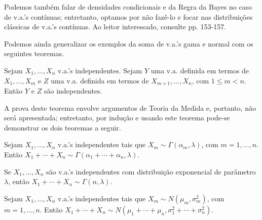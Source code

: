 \documentclass[../Notas.tex]{subfiles}
\begin{document}
\begin{remark}
Podemos também falar de densidades condicionais e da Regra da Bayes no caso de v.a.'s contínuas; entretanto, optamos por não fazê-lo e focar nas distribuições clássicas de v.a.'s contínuas. Ao leitor interessado, consulte \cite{Hoel} pp. 153-157.
\end{remark}

Podemos ainda generalizar os exemplos da soma de v.a.'s gama e normal com os seguintes teoremas.

\begin{theorem}
Sejam $X_1, \dots, X_n$ v.a.'s independentes. Sejam $Y$ uma v.a. definida em termos de $X_1, \dots, X_m$ e $Z$ uma v.a. definida em termos de $X_{m+1}, \dots, X_n$, com $1\leq m < n$. Então $Y$ e $Z$ são independentes.
\end{theorem}

A prova deste teorema envolve argumentos de Teoria da Medida e, portanto, não será apresentada; entretanto, por indução e usando este teorema pode-se demonstrar os dois teoremas a seguir.

\begin{theorem}
Sejam $X_1, \dots, X_n$ v.a.'s independentes tais que $X_m\sim\Gamma(\alpha_m, \lambda)$, com $m=1,\dots,n$. Então $X_1 + \cdots + X_n\sim\Gamma(\alpha_1 + \cdots + \alpha_n, \lambda)$.
\end{theorem}

\begin{corollary}
Se $X_1, \dots, X_n$ são v.a.'s independentes com distribuição exponencial de parâmetro $\lambda$, então $X_1 + \cdots + X_n\sim\Gamma(n,\lambda)$.
\end{corollary}

\begin{theorem}
Sejam $X_1, \dots, X_n$ v.a.'s independentes tais que $X_m\sim N(\mu_m, \sigma_m^2)$, com $m=1,\dots,n$. Então $X_1 + \cdots + X_n\sim N(\mu_1 + \cdots + \mu_n, \sigma_1^2 + \cdots + \sigma_n^2)$.
\end{theorem}
\end{document}
